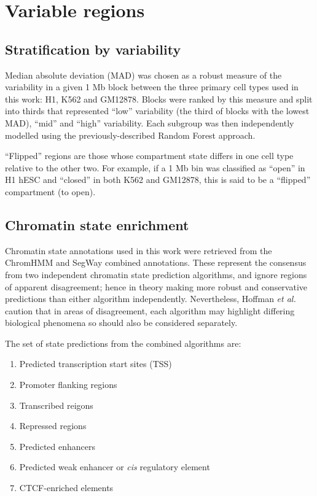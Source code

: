 \documentclass[a4paper,11pt,oneside]{book}
\begin{document}
\section{Variable regions}\label{variable-regions}

\subsection{Stratification by
variability}\label{sec:variable}

Median absolute deviation (MAD) was chosen as a robust measure of the
variability in a given 1 Mb block between the three primary cell types
used in this work: H1, K562 and GM12878. Blocks were ranked by this
measure and split into thirds that represented ``low'' variability (the
third of blocks with the lowest MAD), ``mid'' and ``high'' variability.
Each subgroup was then independently modelled using the
previously-described Random Forest approach.

``Flipped'' regions are those whose compartment state differs in one
cell type relative to the other two. For example, if a 1 Mb bin was
classified as ``open'' in H1 hESC and ``closed'' in both K562 and
GM12878, this is said to be a ``flipped'' compartment (to open).

\subsection{Chromatin state enrichment}\label{enhancer-enrichment}

Chromatin state annotations used in this work were retrieved from the ChromHMM\cite{Ernst2011} and SegWay\cite{Hoffman2012} combined annotations.\cite{Hoffman2013} These represent the consensus from two independent chromatin state prediction algorithms, and ignore regions of apparent disagreement; hence in theory making more robust and conservative predictions than either algorithm independently. Nevertheless, Hoffman \emph{et al.} caution that in areas of disagreement, each algorithm may highlight differing biological phenomena so should also be considered separately.\cite{Hoffman2013}

The set of state predictions from the combined algorithms are:
\begin{enumerate}
\item Predicted transcription start sites (TSS)
\item Promoter flanking regions
\item Transcribed reigons
\item Repressed regions
\item Predicted enhancers
\item Predicted weak enhancer or \emph{cis} regulatory element
\item CTCF-enriched elements
\end{enumerate}
\end{document}

